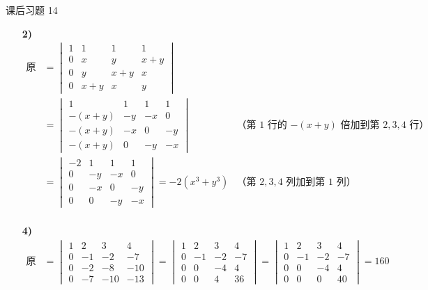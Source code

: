 \begin{problem}
	课后习题 14
	\begin{solution}
		\begin{enumerate}
			\item[\textbf{2)}]
			$$
			\begin{aligned}
				\text{原式} & = \begin{vmatrix}
					1 & 1 & 1 & 1 \\
					0 & x & y & x+y \\
					0 & y & x+y & x \\
					0 & x+y & x & y
				\end{vmatrix} & \\
				& = \begin{vmatrix}
					1 & 1 & 1 & 1 \\
					-(x+y) & -y & -x & 0 \\
					-(x+y) & -x & 0 & -y \\
					-(x+y) & 0 & -y & -x
				\end{vmatrix} & \text{（第 $1$ 行的 $-(x+y)$ 倍加到第 $2,3,4$ 行）} \\
				& = \begin{vmatrix}
					-2 & 1 & 1 & 1 \\
					0 & -y & -x & 0 \\
					0 & -x & 0 & -y \\
					0 & 0 & -y & -x
				\end{vmatrix} = -2(x^3 + y^3) & \text{（第 $2,3,4$ 列加到第 $1$ 列）}\\
			\end{aligned}
			$$

			\item[\textbf{4)}]
			$$
			\begin{aligned}
				\text{原式} & = \begin{vmatrix}
					1 & 2 & 3 & 4 \\
					0 & -1 & -2 & -7 \\
					0 & -2 & -8 & -10 \\
					0 & -7 & -10 & -13
				\end{vmatrix} = \begin{vmatrix}
					1 & 2 & 3 & 4 \\
					0 & -1 & -2 & -7 \\
					0 & 0 & -4 & 4 \\
					0 & 0 & 4 & 36
				\end{vmatrix} = \begin{vmatrix}
					1 & 2 & 3 & 4 \\
					0 & -1 & -2 & -7 \\
					0 & 0 & -4 & 4 \\
					0 & 0 & 0 & 40
				\end{vmatrix} = 160 \\
			\end{aligned}
			$$


\end{enumerate}
\end{solution}
\end{problem}
